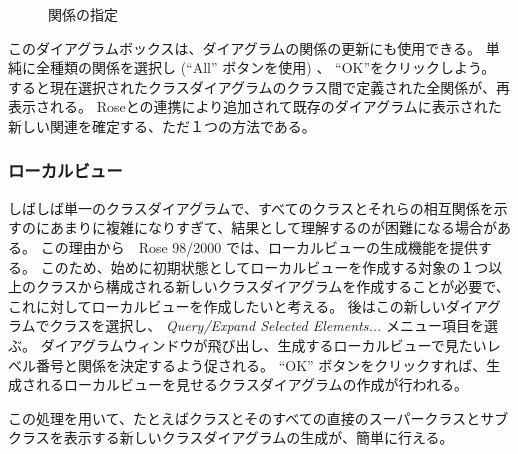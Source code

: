 \documentclass[\pformat,12pt]{jarticle}
\newcommand{\link}{Roseとの連携}
\newcommand{\rose}{Rose 98/2000}
\begin{document}
\begin{figure}[htb]
\begin{center}
\mbox{}
\caption{関係の指定　\label{fig:relations}}
\end{center}
\end{figure}

このダイアグラムボックスは、ダイアグラムの関係の更新にも使用できる。
単純に全種類の関係を選択し (``All'' ボタンを使用) 、 ``OK''をクリックしよう。
すると現在選択されたクラスダイアグラムのクラス間で定義された全関係が、再表示される。
\link{}により追加されて既存のダイアグラムに表示された新しい関連を確定する、ただ１つの方法である。

\subsubsection*{ローカルビュー}


しばしば単一のクラスダイアグラムで、すべてのクラスとそれらの相互関係を示すのにあまりに複雑になりすぎて、結果として理解するのが困難になる場合がある。
この理由から　\rose{} では、ローカルビューの生成機能を提供する。
このため、始めに初期状態としてローカルビューを作成する対象の１つ以上のクラスから構成される新しいクラスダイアグラムを作成することが必要で、これに対してローカルビューを作成したいと考える。
後はこの新しいダイアグラムでクラスを選択し、 {\it Query/Expand Selected  Elements...} メニュー項目を選ぶ。
ダイアグラムウィンドウが飛び出し、生成するローカルビューで見たいレベル番号と関係を決定するよう促される。
 ``OK'' ボタンをクリックすれば、生成されるローカルビューを見せるクラスダイアグラムの作成が行われる。

この処理を用いて、たとえばクラスとそのすべての直接のスーパークラスとサブクラスを表示する新しいクラスダイアグラムの生成が、簡単に行える。
\end{document}
